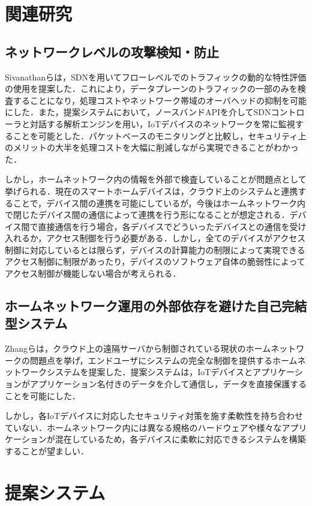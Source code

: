 \documentclass[Japanese]{dicomopapers}
\begin{document}
\section{関連研究}
\subsection{ネットワークレベルの攻撃検知・防止}
Sivanathanらは，SDNを用いてフローレベルでのトラフィックの動的な特性評価の使用を提案した\cite{lowcost}．これにより，データプレーンのトラフィックの一部のみを検査することになり，処理コストやネットワーク帯域のオーバヘッドの抑制を可能にした．また，提案システムにおいて，ノースバンドAPIを介してSDNコントローラと対話する解析エンジンを用い，IoTデバイスのネットワークを常に監視することを可能とした．パケットベースのモニタリングと比較し，セキュリティ上のメリットの大半を処理コストを大幅に削減しながら実現できることがわかった．\par
しかし，ホームネットワーク内の情報を外部で検査していることが問題点として挙げられる．現在のスマートホームデバイスは，クラウド上のシステムと連携することで，デバイス間の連携を可能にしているが，今後はホームネットワーク内で閉じたデバイス間の通信によって連携を行う形になることが想定される\cite{d2d}．デバイス間で直接通信を行う場合，各デバイスでどういったデバイスとの通信を受け入れるか，アクセス制御を行う必要がある．しかし，全てのデバイスがアクセス制御に対応しているとは限らず，デバイスの計算能力の制限によって実現できるアクセス制御に制限があったり，デバイスのソフトウェア自体の脆弱性によってアクセス制御が機能しない場合が考えられる\cite{disap}．

\subsection{ホームネットワーク運用の外部依存を避けた自己完結型システム}
Zhangらは，クラウド上の遠隔サーバから制御されている現状のホームネットワークの問題点を挙げ，エンドユーザにシステムの完全な制御を提供するホームネットワークシステムを提案した\cite{sover}．提案システムは，IoTデバイスとアプリケーションがアプリケーション名付きのデータを介して通信し，データを直接保護することを可能にした．\par
しかし，各IoTデバイスに対応したセキュリティ対策を施す柔軟性を持ち合わせていない．ホームネットワーク内には異なる規格のハードウェアや様々なアプリケーションが混在しているため，各デバイスに柔軟に対応できるシステムを構築することが望ましい．

\section{提案システム}
\end{document}
